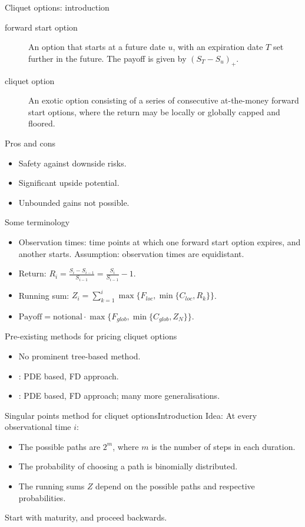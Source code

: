 \documentclass[utf8,t,compress,xcolor=svgnames,handout]{beamer}
\newcommand\pro{\item[\textbf{\CheckedBox}]}
\newcommand\con{\item[\textbf{\XBox}]}
\begin{document}
	\begin{frame}[allowframebreaks]{Cliquet options: introduction}
		\begin{description}
			\item[forward start option] An option that starts at a future date $ u $, with an expiration date $ T $ set further in the future. The payoff is given by $ (S_T - S_u)_+ $.
			\item[cliquet option] An exotic option consisting of a series of consecutive at-the-money forward start options, where the return may be locally or globally capped and floored.
		\end{description}
		\begin{block}{Pros and cons}
			\begin{itemize}
				\pro Safety against downside risks.
				\pro Significant upside potential.
				\con Unbounded gains not possible.
			\end{itemize}
		\end{block}
		\begin{block}{Some terminology}
			\begin{itemize}
				\item Observation times: time points at which one forward start option expires, and another starts. Assumption: observation times are equidistant.
				\item Return: $ R_i = \frac{S_i - S_{i-1}}{S_{i-1}} = \frac{S_i}{S_{i-1}} - 1 $.
				\item Running sum: $ Z_i = \sum_{k = 1}^{i} \max \{ F_{loc}, \min \{ C_{loc}, R_k \} \} $.
				\item $ \mathrm{Payoff} = \mathrm{notional} \cdot \max \{ F_{glob}, \min \{ C_{glob}, Z_{N} \} \} $.
			\end{itemize}
		\end{block}
		\begin{block}{Pre-existing methods for pricing cliquet options}
			\begin{itemize}
				\item No prominent tree-based method.
				\item \cite{Wilmott2002}: PDE based, FD approach.
				\item \cite{Windcliff2006}: PDE based, FD approach; many more generalisations.
			\end{itemize}
		\end{block}
	\end{frame}
	
	
	\begin{frame}{Singular points method for cliquet options}{Introduction}
		Idea: At every observational time $ i $: 
		\begin{itemize}
			\item The possible paths are $ 2^m $, where $ m $ is the number of steps in each duration.
			\item The probability of choosing a path is binomially distributed.
			\item The running sums $ Z $ depend on the possible paths and respective probabilities.
		\end{itemize}
		Start with maturity, and proceed backwards.
	\end{frame}
	
\end{document}

